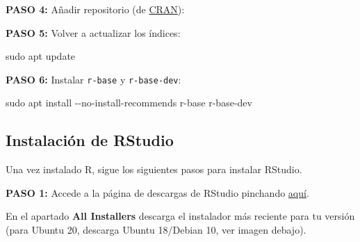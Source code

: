 \documentclass[
  title=normal,
  notoc,
  bib=normal]{mnye}
\newenvironment{Shaded}{\begin{snugshade}}{\end{snugshade}}
\newcommand{\AttributeTok}[1]{\textcolor[rgb]{0.77,0.63,0.00}{#1}}
\newcommand{\ExtensionTok}[1]{#1}
\newcommand{\FunctionTok}[1]{\textcolor[rgb]{0.00,0.00,0.00}{#1}}
\newcommand{\NormalTok}[1]{#1}
\newcommand{\StringTok}[1]{\textcolor[rgb]{0.31,0.60,0.02}{#1}}
\newcommand{\VariableTok}[1]{\textcolor[rgb]{0.00,0.00,0.00}{#1}}
\begin{document}
\textbf{PASO 4: } Añadir repositorio (de \href{https://cran.r-project.org/}{CRAN}):

\begin{Shaded}
\end{Shaded}

\textbf{PASO 5: } Volver a actualizar los índices:

\begin{Shaded}
\begin{Highlighting}[]
\FunctionTok{sudo}\NormalTok{ apt update }
\end{Highlighting}
\end{Shaded}

\textbf{PASO 6: } Instalar \texttt{r-base} y \texttt{r-base-dev}:

\begin{Shaded}
\begin{Highlighting}[]
\FunctionTok{sudo}\NormalTok{ apt install }\AttributeTok{{-}{-}no{-}install{-}recommends}\NormalTok{ r{-}base r{-}base{-}dev }
\end{Highlighting}
\end{Shaded}

\hypertarget{instalaciuxf3n-de-rstudio}{%
\subsection{Instalación de RStudio}\label{instalaciuxf3n-de-rstudio}}

Una vez instalado R, sigue los siguientes pasos para instalar RStudio.

\textbf{PASO 1: }
Accede a la página de descargas de RStudio pinchando \href{https://rstudio.com/products/rstudio/download/\#download}{aquí}.

En el apartado \textbf{All Installers} descarga el instalador más reciente para tu versión (para Ubuntu 20, descarga Ubuntu 18/Debian 10, ver imagen debajo).
\end{document}
